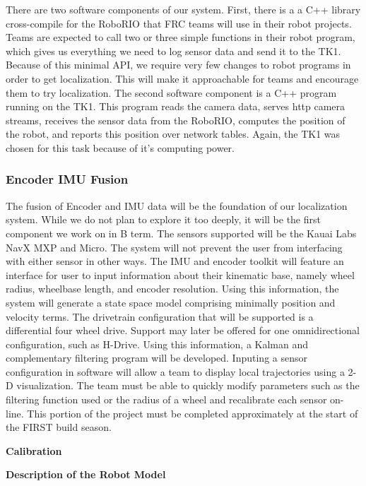 \documentclass{article}
\begin{document}
			There are two software components of our system. First, there is a a C++ library cross-compile for the RoboRIO that FRC teams will use in their robot projects. Teams are expected to call two or three simple functions in their robot program, which gives us everything we need to log sensor data and send it to the TK1. Because of this minimal API, we require very few changes to robot programs in order to get localization. This will make it approachable for teams and encourage them to try localization. The second software component is a C++ program running on the TK1. This program reads the camera data, serves http camera streams, receives the sensor data from the RoboRIO, computes the position of the robot, and reports this position over network tables. Again, the TK1 was chosen for this task because of it's computing power.

    \subsubsection{Encoder IMU Fusion}

      The fusion of Encoder and IMU data will be the foundation of our localization system. While we do not plan to explore it too deeply, it will be the first component we work on in B term. The sensors supported will be the Kauai Labs NavX MXP and Micro. The system will not prevent the user from interfacing with either sensor in other ways. The IMU and encoder toolkit will feature an interface for user to input information about their kinematic base, namely wheel radius, wheelbase length, and encoder resolution. Using this information, the system will generate a state space model comprising minimally position and velocity terms. The drivetrain configuration that will be supported is a differential four wheel drive. Support may later be offered for one omnidirectional configuration, such as H-Drive. Using this information, a Kalman and complementary filtering program will be developed. Inputing a sensor configuration in software will allow a team to display local trajectories using a 2-D visualization. The team must be able to quickly modify parameters such as the filtering function used or the radius of a wheel and recalibrate each sensor on-line. This portion of the project must be completed approximately at the start of the FIRST build season.



      \textbf{Calibration}

      \textbf{Description of the Robot Model}
\end{document}
